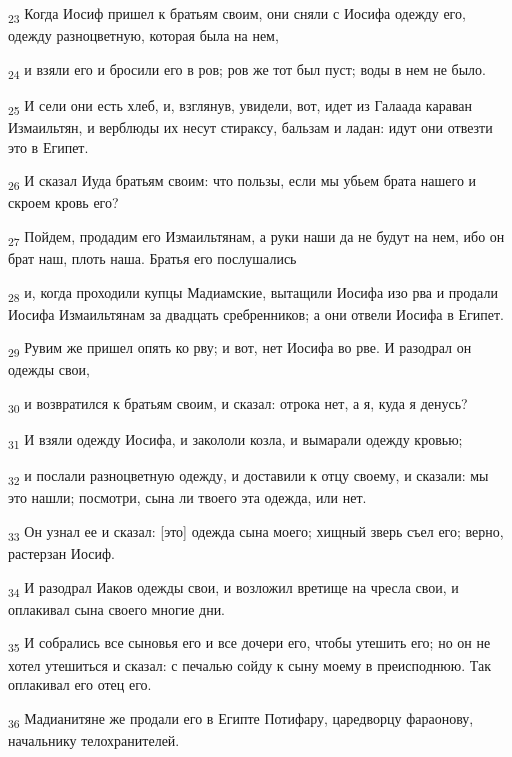 \begin{tcolorbox}
\textsubscript{23} Когда Иосиф пришел к братьям своим, они сняли с Иосифа одежду его, одежду разноцветную, которая была на нем,
\end{tcolorbox}
\begin{tcolorbox}
\textsubscript{24} и взяли его и бросили его в ров; ров же тот был пуст; воды в нем не было.
\end{tcolorbox}
\begin{tcolorbox}
\textsubscript{25} И сели они есть хлеб, и, взглянув, увидели, вот, идет из Галаада караван Измаильтян, и верблюды их несут стираксу, бальзам и ладан: идут они отвезти это в Египет.
\end{tcolorbox}
\begin{tcolorbox}
\textsubscript{26} И сказал Иуда братьям своим: что пользы, если мы убьем брата нашего и скроем кровь его?
\end{tcolorbox}
\begin{tcolorbox}
\textsubscript{27} Пойдем, продадим его Измаильтянам, а руки наши да не будут на нем, ибо он брат наш, плоть наша. Братья его послушались
\end{tcolorbox}
\begin{tcolorbox}
\textsubscript{28} и, когда проходили купцы Мадиамские, вытащили Иосифа изо рва и продали Иосифа Измаильтянам за двадцать сребренников; а они отвели Иосифа в Египет.
\end{tcolorbox}
\begin{tcolorbox}
\textsubscript{29} Рувим же пришел опять ко рву; и вот, нет Иосифа во рве. И разодрал он одежды свои,
\end{tcolorbox}
\begin{tcolorbox}
\textsubscript{30} и возвратился к братьям своим, и сказал: отрока нет, а я, куда я денусь?
\end{tcolorbox}
\begin{tcolorbox}
\textsubscript{31} И взяли одежду Иосифа, и закололи козла, и вымарали одежду кровью;
\end{tcolorbox}
\begin{tcolorbox}
\textsubscript{32} и послали разноцветную одежду, и доставили к отцу своему, и сказали: мы это нашли; посмотри, сына ли твоего эта одежда, или нет.
\end{tcolorbox}
\begin{tcolorbox}
\textsubscript{33} Он узнал ее и сказал: [это] одежда сына моего; хищный зверь съел его; верно, растерзан Иосиф.
\end{tcolorbox}
\begin{tcolorbox}
\textsubscript{34} И разодрал Иаков одежды свои, и возложил вретище на чресла свои, и оплакивал сына своего многие дни.
\end{tcolorbox}
\begin{tcolorbox}
\textsubscript{35} И собрались все сыновья его и все дочери его, чтобы утешить его; но он не хотел утешиться и сказал: с печалью сойду к сыну моему в преисподнюю. Так оплакивал его отец его.
\end{tcolorbox}
\begin{tcolorbox}
\textsubscript{36} Мадианитяне же продали его в Египте Потифару, царедворцу фараонову, начальнику телохранителей.
\end{tcolorbox}

